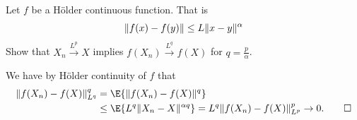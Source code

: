 
\begin{exercise}[subtitle={Hölder continuos functions \Coffeecup}]
    Let \(f\) be a Hölder continuous function. That is
    \[
        \lVert f(x) - f(y)\rVert \le L \lVert x-y\rVert^\alpha
    \]
    Show that \(X_n \overset{L^p}\to X\) implies \(f(X_n) \overset{L^q}\to f(X)\) for \(q = \frac{p}{\alpha}\).
\end{exercise}

\begin{solution}
    We have by Hölder continuity of \(f\) that
    \begin{align*}
        \norm{f(X_n)- f(X)}_{L^q}^q
        &= \E{\norm{f(X_n) - f(X)}^q}
        \\
        &\le \E{L^q \norm{X_n - X}^{\alpha q}}
        = L^q \norm{f(X_n) - f(X)}_{L^p}^p \to 0.
        \qedhere
    \end{align*}
\end{solution}
